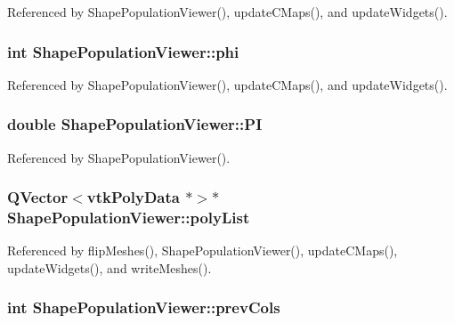 Referenced by Shape\-Population\-Viewer(), update\-C\-Maps(), and update\-Widgets().

\hypertarget{class_shape_population_viewer_a722158753a5d11f2f618d59ae743cb0c}{
\subsubsection[{phi}]{\setlength{\rightskip}{0pt plus 5cm}int Shape\-Population\-Viewer\-::phi\hspace{0.3cm}{\ttfamily [protected]}}}\label{class_shape_population_viewer_a722158753a5d11f2f618d59ae743cb0c}


Referenced by Shape\-Population\-Viewer(), update\-C\-Maps(), and update\-Widgets().

\hypertarget{class_shape_population_viewer_a9b68299dba604343c319858e005ef644}{
\subsubsection[{P\-I}]{\setlength{\rightskip}{0pt plus 5cm}double Shape\-Population\-Viewer\-::\-P\-I\hspace{0.3cm}{\ttfamily [protected]}}}\label{class_shape_population_viewer_a9b68299dba604343c319858e005ef644}


Referenced by Shape\-Population\-Viewer().

\hypertarget{class_shape_population_viewer_a5533e0d642467a70e349fa79a24bfc51}{
\subsubsection[{poly\-List}]{\setlength{\rightskip}{0pt plus 5cm}Q\-Vector$<$vtk\-Poly\-Data $\ast$$>$$\ast$ Shape\-Population\-Viewer\-::poly\-List\hspace{0.3cm}{\ttfamily [protected]}}}\label{class_shape_population_viewer_a5533e0d642467a70e349fa79a24bfc51}


Referenced by flip\-Meshes(), Shape\-Population\-Viewer(), update\-C\-Maps(), update\-Widgets(), and write\-Meshes().

\hypertarget{class_shape_population_viewer_aa9022fa806169eef3b46a053cc1e11ce}{
\subsubsection[{prev\-Cols}]{\setlength{\rightskip}{0pt plus 5cm}int Shape\-Population\-Viewer\-::prev\-Cols\hspace{0.3cm}{\ttfamily [protected]}}}\label{class_shape_population_viewer_aa9022fa806169eef3b46a053cc1e11ce}


